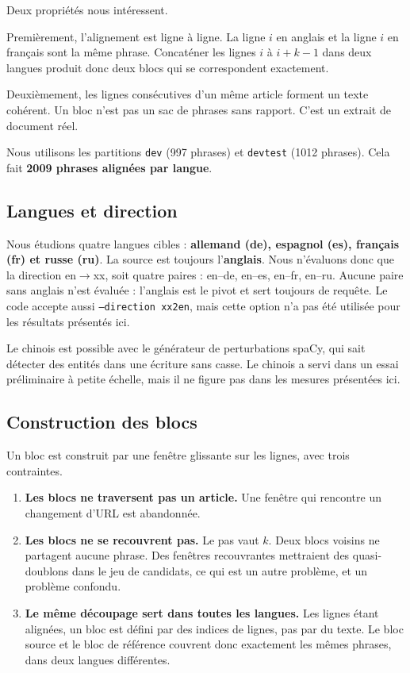 \documentclass[11pt]{article}
\newcommand{\code}[1]{\texttt{\small #1}}
\begin{document}
Deux propriétés nous intéressent.

Premièrement, l'alignement est ligne à ligne.
La ligne $i$ en anglais et la ligne $i$ en français sont la même phrase.
Concaténer les lignes $i$ à $i+k-1$ dans deux langues produit donc deux blocs qui se correspondent exactement.

Deuxièmement, les lignes consécutives d'un même article forment un texte cohérent.
Un bloc n'est pas un sac de phrases sans rapport.
C'est un extrait de document réel.

Nous utilisons les partitions \code{dev} (997 phrases) et \code{devtest} (1012 phrases).
Cela fait \textbf{2009 phrases alignées par langue}.

\subsection{Langues et direction}

Nous étudions quatre langues cibles : \textbf{allemand (de), espagnol (es), français (fr) et russe (ru)}.
La source est toujours l'\textbf{anglais}.
Nous n'évaluons donc que la direction en$\to$xx, soit quatre paires : en--de, en--es, en--fr, en--ru.
Aucune paire sans anglais n'est évaluée : l'anglais est le pivot et sert toujours de requête.
Le code accepte aussi \code{--direction xx2en}, mais cette option n'a pas été utilisée pour les résultats présentés ici.

Le chinois est possible avec le générateur de perturbations spaCy, qui sait détecter des entités dans une écriture sans casse.
Le chinois a servi dans un essai préliminaire à petite échelle, mais il ne figure pas dans les mesures présentées ici.

\subsection{Construction des blocs}

Un bloc est construit par une fenêtre glissante sur les lignes, avec trois contraintes.

\begin{enumerate}
\item \textbf{Les blocs ne traversent pas un article.} Une fenêtre qui rencontre un changement d'URL est abandonnée.
\item \textbf{Les blocs ne se recouvrent pas.} Le pas vaut $k$. Deux blocs voisins ne partagent aucune phrase. Des fenêtres recouvrantes mettraient des quasi-doublons dans le jeu de candidats, ce qui est un autre problème, et un problème confondu.
\item \textbf{Le même découpage sert dans toutes les langues.} Les lignes étant alignées, un bloc est défini par des indices de lignes, pas par du texte. Le bloc source et le bloc de référence couvrent donc exactement les mêmes phrases, dans deux langues différentes.
\end{enumerate}
\end{document}
